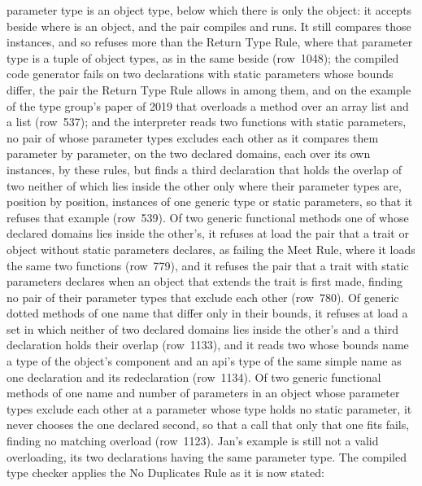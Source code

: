 \begin{description}
parameter type is an object type, below which there is only the object: it
accepts  beside
 where  is an
object, and the pair compiles and runs.
It still compares those instances, and so refuses more than the Return Type
Rule, where that parameter type is a tuple of object types, as in the same
 beside
(row~1048);
the compiled code generator fails on two declarations with
static parameters whose bounds differ, the pair the Return Type Rule allows in
 among them, and on the example of the type
group's paper of 2019 that overloads a method over an array list and a list
(row~537); and the interpreter reads two functions with static parameters, no
pair of whose parameter types excludes each other as it compares them parameter
by parameter, on the two declared domains, each over its own instances, by these
rules, but finds a third declaration that holds the overlap of two neither of
which lies inside the other only where their parameter types are, position by
position, instances of one generic type or static parameters, so that it
refuses that example (row~539).
Of two generic functional methods one of whose declared domains lies inside
the other's, it refuses at load the pair that a trait or object without
static parameters declares, as failing the Meet Rule, where it loads the same
two functions (row~779), and it refuses the pair that a trait with static
parameters declares when an object that extends the trait is first made,
finding no pair of their parameter types that exclude each other (row~780).
Of generic dotted methods of one name that differ only in their bounds, it
refuses at load a set in which neither of two declared domains lies inside the
other's and a third declaration holds their overlap (row~1133), and it reads
two whose bounds name a type of the object's component and an api's type of
the same simple name as one declaration and its redeclaration (row~1134).
Of two generic functional methods of one name and number of parameters in an
object whose parameter types exclude each other at a parameter whose type holds
no static parameter, it never chooses the one declared second, so that a call
that only that one fits fails, finding no matching overload (row~1123).
Jan's example is still not a valid overloading, its two declarations having the
same parameter type.
The compiled type checker applies the No Duplicates Rule as it is now stated:

\end{description}
